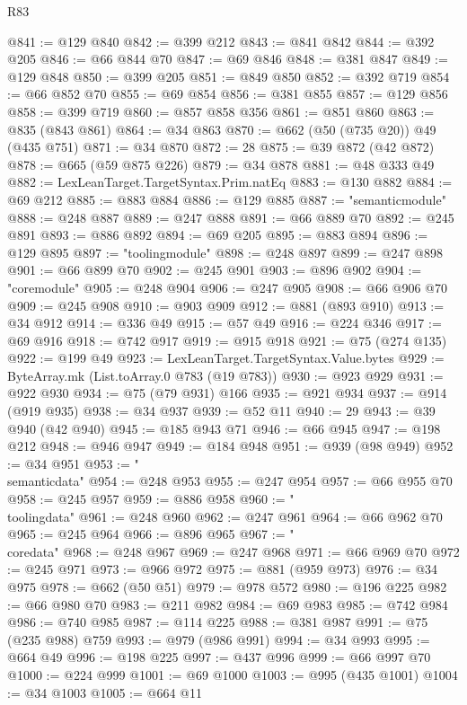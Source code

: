 \begin{lexlean}{R83}
\begin{coremodule}
@841 := @129 @840
@842 := @399 @212
@843 := @841 @842
@844 := @392 @205
@846 := @66 @844 @70
@847 := @69 @846
@848 := @381 @847
@849 := @129 @848
@850 := @399 @205
@851 := @849 @850
@852 := @392 @719
@854 := @66 @852 @70
@855 := @69 @854
@856 := @381 @855
@857 := @129 @856
@858 := @399 @719
@860 := @857 @858 @356
@861 := @851 @860
@863 := @835 (@843 @861)
@864 := @34 @863
@870 := @662 (@50 (@735 @20)) @49 (@435 @751)
@871 := @34 @870
@872 := 28
@875 := @39 @872 (@42 @872)
@878 := @665 (@59 @875 @226)
@879 := @34 @878
@881 := @48 @333 @49
@882 := LexLeanTarget.TargetSyntax.Prim.natEq
@883 := @130 @882
@884 := @69 @212
@885 := @883 @884
@886 := @129 @885
@887 := "semanticmodule"
@888 := @248 @887
@889 := @247 @888
@891 := @66 @889 @70
@892 := @245 @891
@893 := @886 @892
@894 := @69 @205
@895 := @883 @894
@896 := @129 @895
@897 := "toolingmodule"
@898 := @248 @897
@899 := @247 @898
@901 := @66 @899 @70
@902 := @245 @901
@903 := @896 @902
@904 := "coremodule"
@905 := @248 @904
@906 := @247 @905
@908 := @66 @906 @70
@909 := @245 @908
@910 := @903 @909
@912 := @881 (@893 @910)
@913 := @34 @912
@914 := @336 @49
@915 := @57 @49
@916 := @224 @346
@917 := @69 @916
@918 := @742 @917
@919 := @915 @918
@921 := @75 (@274 @135)
@922 := @199 @49
@923 := LexLeanTarget.TargetSyntax.Value.bytes
@929 := ByteArray.mk (List.toArray.{0} @783 (@19 @783))
@930 := @923 @929
@931 := @922 @930
@934 := @75 (@79 @931) @166
@935 := @921 @934
@937 := @914 (@919 @935)
@938 := @34 @937
@939 := @52 @11
@940 := 29
@943 := @39 @940 (@42 @940)
@945 := @185 @943 @71
@946 := @66 @945
@947 := @198 @212
@948 := @946 @947
@949 := @184 @948
@951 := @939 (@98 @949)
@952 := @34 @951
@953 := "\\semanticdata"
@954 := @248 @953
@955 := @247 @954
@957 := @66 @955 @70
@958 := @245 @957
@959 := @886 @958
@960 := "\\toolingdata"
@961 := @248 @960
@962 := @247 @961
@964 := @66 @962 @70
@965 := @245 @964
@966 := @896 @965
@967 := "\\coredata"
@968 := @248 @967
@969 := @247 @968
@971 := @66 @969 @70
@972 := @245 @971
@973 := @966 @972
@975 := @881 (@959 @973)
@976 := @34 @975
@978 := @662 (@50 @51)
@979 := @978 @572
@980 := @196 @225
@982 := @66 @980 @70
@983 := @211 @982
@984 := @69 @983
@985 := @742 @984
@986 := @740 @985
@987 := @114 @225
@988 := @381 @987
@991 := @75 (@235 @988) @759
@993 := @979 (@986 @991)
@994 := @34 @993
@995 := @664 @49
@996 := @198 @225
@997 := @437 @996
@999 := @66 @997 @70
@1000 := @224 @999
@1001 := @69 @1000
@1003 := @995 (@435 @1001)
@1004 := @34 @1003
@1005 := @664 @11

\end{coremodule}
\end{lexlean}
